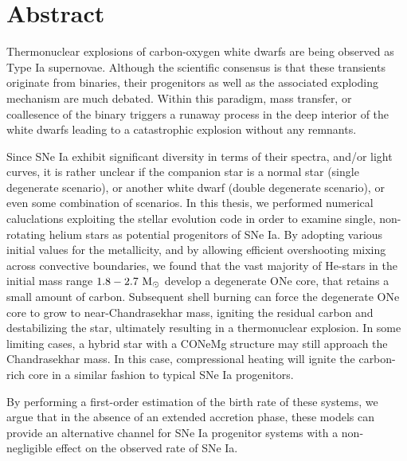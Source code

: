 \documentclass[../main/thesis_msc.tex]{subfiles}
\begin{document}
\chapter*{Abstract}

Thermonuclear explosions of carbon-oxygen white dwarfs are being observed as Type Ia supernovae. Although the scientific consensus is that these transients originate from binaries, their progenitors as well as the associated exploding mechanism are much debated. Within this paradigm, mass transfer, or coallesence of the binary triggers a runaway process in the deep interior of the white dwarfs leading to a catastrophic explosion without any remnants.

Since SNe Ia exhibit significant diversity in terms of their spectra, and/or light curves, it is rather unclear if the companion star is a normal star (single degenerate scenario), or another white dwarf (double degenerate scenario), or even some combination of scenarios. In this thesis, we performed numerical caluclations exploiting the \mesa stellar evolution code in order to examine single, non-rotating helium stars as potential progenitors of SNe Ia. By adopting various initial values for the metallicity, and by allowing efficient overshooting mixing across convective boundaries, we found that the vast majority of He-stars in the initial mass range $\rm 1.8-2.7 \ M_{\odot}$ develop a degenerate ONe core, that retains a small amount of carbon. Subsequent shell burning can force the degenerate ONe core to grow to near-Chandrasekhar mass, igniting the residual carbon and destabilizing the star, ultimately resulting in a thermonuclear explosion. In some limiting cases, a hybrid star with a CONeMg structure may still approach the Chandrasekhar mass. In this case, compressional heating will ignite the carbon-rich core in a similar fashion to typical SNe Ia progenitors.

By performing a first-order estimation of the birth rate of these systems, we argue that in the absence of an extended accretion phase, these models can provide an alternative channel for SNe Ia progenitor systems with a non-negligible effect on the observed rate of SNe Ia.
\end{document}
